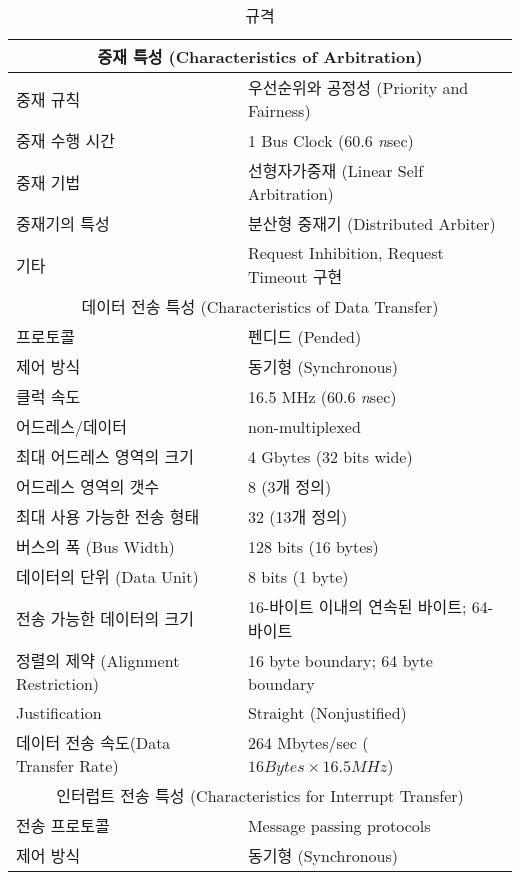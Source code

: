 %
\begin{table}[htbp]
\caption{ 규격}\label{table:bus-spec}
  \begin{center}
\begingroup
\setlength{\tabcolsep}{6pt} %
\renewcommand{\arraystretch}{0.9} %
  \begin{tabular}{|l l|} \hline
   \multicolumn{2}{|c|}{중재 특성 (Characteristics of Arbitration)} \\ \hline
      중재 규칙 & 우선순위와 공정성 (Priority and Fairness) \\
      중재 수행 시간 & 1 Bus Clock (60.6 {\it n\/}sec) \\
      중재 기법 & 선형자가중재 (Linear Self Arbitration) \\
      중재기의 특성 & 분산형 중재기 (Distributed Arbiter) \\
      기타 & Request Inhibition, Request Timeout 구현 \\ \hline
   \multicolumn{2}{|c|}{데이터 전송 특성 (Characteristics of Data Transfer)} \\ \hline
      프로토콜 & 펜디드 (Pended) \\
      제어 방식 & 동기형 (Synchronous) \\
      클럭 속도 & 16.5 MHz (60.6 {\it n\/}sec) \\
      어드레스/데이터 & non-multiplexed \\
      최대 어드레스 영역의 크기 & 4 Gbytes (32 bits wide) \\
      어드레스 영역의 갯수 & 8 (3개 정의) \\
      최대 사용 가능한 전송 형태 & 32 (13개 정의) \\
      버스의 폭 (Bus Width) & 128 bits (16 bytes) \\
      데이터의 단위 (Data Unit) & 8 bits (1 byte) \\
      전송 가능한 데이터의 크기 & 16-바이트 이내의 연속된 바이트; 64-바이트 \\
      정렬의 제약 (Alignment Restriction) & 16 byte boundary; 64 byte boundary \\
      Justification & Straight (Nonjustified) \\
      데이터 전송 속도(Data Transfer Rate) & 264 Mbytes/sec ($16Bytes \times 16.5M\!H\!z$)\\ \hline
   \multicolumn{2}{|c|}{인터럽트 전송 특성 (Characteristics for Interrupt Transfer)} \\ \hline
      전송 프로토콜 & Message passing protocols \\
      제어 방식 & 동기형 (Synchronous) \\

\end{tabular}
\end{center}
\end{table}
